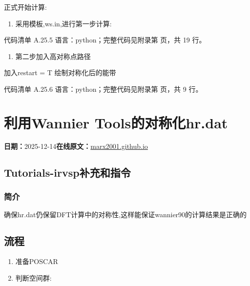 \documentclass[lang=cn,scheme=chinese,color=blue,device=normal,toc=onecol,math=cm]{elegantbook}
\begin{document}
正式开始计算:\par


\begin{enumerate}
\item 采用模板,ws.in,进行第一步计算:
\end{enumerate}


\begin{codeindexbox}{代码清单 A.25.5}
语言：python；完整代码见附录第 \pageref{code:25:5} 页，共 19 行。
\end{codeindexbox}


\begin{enumerate}
\item 第二步加入高对称点路径
\end{enumerate}


加入restart = T 绘制对称化后的能带\par


\begin{codeindexbox}{代码清单 A.25.6}
语言：python；完整代码见附录第 \pageref{code:25:6} 页，共 9 行。
\end{codeindexbox}



\section{利用Wannier Tools的对称化hr.dat}
\begin{articlemeta}
\textbf{日期：}2025-12-14\hfill\textbf{在线原文：}\href{https://marx2001.github.io/sci-note\_posts/20251215-wt-sym}{marx2001.github.io}
\end{articlemeta}

\subsection{Tutorials-irvsp补充和指令}


\subsubsection{简介}


确保hr.dat仍保留DFT计算中的对称性,这样能保证wannier90的计算结果是正确的\par


\subsection{流程}


\begin{enumerate}
\item 准备POSCAR\par
\item 判断空间群:\par
\end{enumerate}
\end{document}
